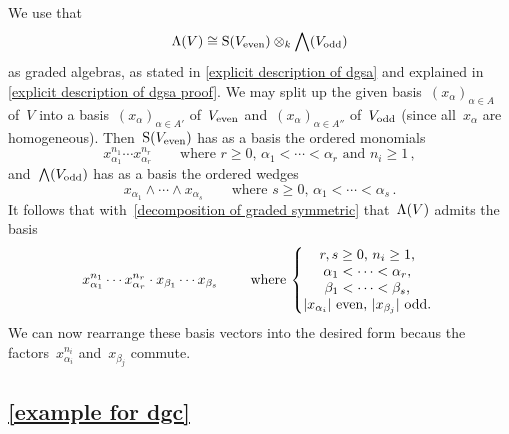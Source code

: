 \documentclass[a4paper,10pt,headings=standardclasses]{scrartcl}
\begin{document}
We use that
\begin{equation}
  \label{decomposition of graded symmetric}
  \operatorname{\Lambda}(V)
  \cong
  \operatorname{S}(V_{\mathrm{even}}) \otimes_k \bigwedge(V_{\mathrm{odd}})
\end{equation}
as graded algebras, as stated in \cref{explicit description of dgsa} and explained in \cref{explicit description of dgsa proof}.
We may split up the given basis~$(x_\alpha)_{\alpha \in A}$ of~$V$ into a basis~$(x_\alpha)_{\alpha \in A'}$ of~$V_{\mathrm{even}}$ and~$(x_\alpha)_{\alpha \in A''}$ of~$V_{\mathrm{odd}}$ (since all~$x_\alpha$ are homogeneous).
Then~$\operatorname{S}(V_{\mathrm{even}})$ has as a basis the ordered monomials
\[
  x_{\alpha_1}^{n_1} \dotsm x_{\alpha_r}^{n_r}
  \qquad
  \text{where~$r \geq 0$,~$\alpha_1 < \dotsb < \alpha_r$ and~$n_i \geq 1$} \,,
\]
and~$\bigwedge(V_{\mathrm{odd}})$ has as a basis the ordered wedges
\[
  x_{\alpha_1} \wedge \dotsb \wedge x_{\alpha_s}
  \qquad
  \text{where~$s \geq 0$,~$\alpha_1 < \dotsb < \alpha_s$} \,.
\]
It follows that with~\eqref{decomposition of graded symmetric} that~$\operatorname{\Lambda}(V)$ admits the basis
\[
  x_{\alpha_1}^{n_1} \dotsm x_{\alpha_r}^{n_r} \cdot x_{\beta_1} \dotsb x_{\beta_s}
  \qquad
  \text{
  where
  $
  \left\{
  \begin{tabular}{@{}c@{}}
    $r, s \geq 0$,~$n_i \geq 1$, \\
    $\alpha_1 < \dotsb < \alpha_r$, \\
    $\beta_1 < \dotsb < \beta_s$, \\
    $\hdeg{x_{\alpha_i}}$ even,~$\hdeg{x_{\beta_j}}$ odd.
  \end{tabular}
  \right.
  $
  }
\]
We can now rearrange these basis vectors into the desired form becaus the factors~$x_{\alpha_i}^{n_i}$ and~$x_{\beta_j}$ commute.



\subsection{\cref{example for dgc}}
\label{example for dgc proof}
\end{document}

